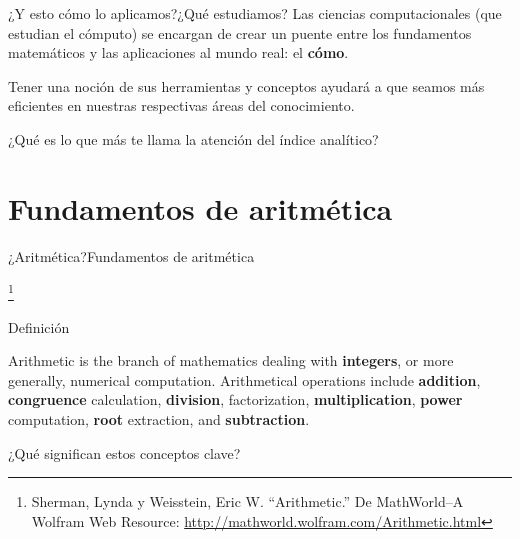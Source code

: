 \documentclass[spanish, handout]{beamer}
\newcommand\blfootnote[1]{%
\begingroup
\renewcommand\thefootnote{}\footnote{#1}%
\addtocounter{footnote}{-1}%
\endgroup
}
\begin{document}
\begin{frame}{¿Y esto cómo lo aplicamos?}{¿Qué estudiamos?}
    Las \alert{ciencias computacionales} (que estudian el cómputo) se encargan de crear un puente entre los fundamentos matemáticos y las aplicaciones al mundo real: el \textbf{cómo}. \pause

    \bigskip

    Tener una noción de sus herramientas y conceptos ayudará a que seamos más eficientes en nuestras respectivas áreas del conocimiento. \pause

    \bigskip

    \begin{center}
        \Large
        ¿Qué es lo que más te llama la atención del índice analítico?
    \end{center}
\end{frame}

\section{Fundamentos de aritmética}

\begin{frame}{¿Aritmética?}{Fundamentos de aritmética}
    
    \blfootnote{Sherman, Lynda y Weisstein, Eric W. ``Arithmetic.'' De MathWorld--A Wolfram Web Resource: \url{http://mathworld.wolfram.com/Arithmetic.html}}

    \begin{block}{Definición}
        \begin{displayquote}
            Arithmetic is the branch of mathematics dealing with \textbf<2->{integers}, or more generally, \alert<2->{numerical computation}.
            Arithmetical operations include \textbf<2->{addition}, \textbf<2->{congruence} calculation, \textbf<2->{division}, factorization, \textbf<2->{multiplication}, \textbf<2->{power} computation, \textbf<2->{root} extraction, and \textbf<2->{subtraction}.
        \end{displayquote}
    \end{block} \pause
    
    \bigskip

    \begin{center}
        \Large
        ¿Qué significan estos conceptos clave?
    \end{center}
\end{frame}
\end{document}
